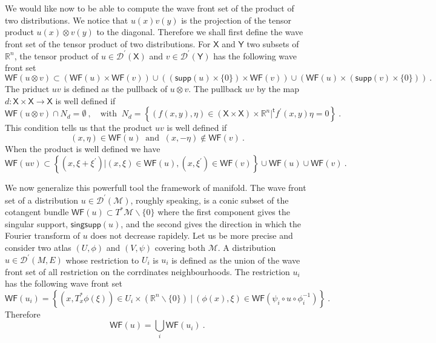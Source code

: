 \documentclass[10pt]{book}
\newcommand{\supp}{\mathsf{supp}}
\newcommand{\singsupp}{\mathsf{singsupp}}
\newcommand{\WF}{\mathsf{WF}}
\newcommand{\Dcal}{\mathcal{D}}
\newcommand{\Mcal}{\mathcal{M}}
\newcommand{\Rbb}{\mathbb{R}}
\newcommand{\Xsf}{\mathsf{X}}
\newcommand{\Ysf}{\mathsf{Y}}
\newcommand{\tsf}{\mathsf{t}}
\theoremstyle{break}
\begin{document}
We would like now to be able to compute the wave front set of the product of two distributions. We notice that $u(x)v(y)$ is the projection of the tensor product $u(x) \otimes v(y)$ to the diagonal. Therefore we shall first define the wave front set of the tensor product of two distributions. For $\Xsf$ and $\Ysf$ two subsets of $\Rbb^n$, the tensor product of $u\in\Dcal^\prime(\Xsf)$ and $v\in\Dcal^\prime(\Ysf)$ has the following wave front set
%
\begin{equation*}
\WF(u \otimes v) \subset \left( \WF(u) \times \WF(v) \right) \cup \left( \left( \supp(u) \times \{0\} \right) \times \WF(v) \right) \cup \left( \WF(u) \times \left( \supp(v) \times \{0\} \right) \right) \ . 
\end{equation*}
%
The priduct $uv$ is defined as the pullback of $u \otimes v$. The pullback $u v$ by the map $d : \Xsf \times \Xsf \to \Xsf$ is well defined if 
%
\begin{equation*}
\WF(u \otimes v) \cap N_d = \emptyset \ , \quad \mbox{with } \ N_d = \left\{ (f(x,y) , \eta) \in ( \Xsf \times \Xsf )\times \Rbb^n | ^{\tsf}f^\prime(x,y) \eta = 0 \right\} \ .
\end{equation*}
%
This condition tells us that the product $uv$ is well defined if 
%
\begin{equation*}
(x,\eta) \in \WF(u) \ \mbox{ and } \ (x,-\eta) \notin \WF(v) \ . 
\end{equation*}
%
When the product is well defined we have 
%
\begin{equation*}
\WF(u v) \subset \left\{ (x,\xi+\xi^\prime) | (x,\xi) \in \WF(u) , (x,\xi^\prime) \in \WF(v) \right\} \cup \WF(u) \cup \WF(v) \ . 
\end{equation*}


\bigskip


We now generalize this powerfull tool the framework of manifold. The wave front set of a distribution $u \in \Dcal^\prime(\Mcal)$, roughly speaking, is a conic subset of the cotangent bundle $\WF(u) \subset T^\ast\Mcal\backslash\{0\}$ where the first component gives the singular support, $\singsupp(u)$, and the second gives the direction in which the Fourier transform of $u$ does not decrease rapidely. Let us be more precise and consider two atlas ${(U,\phi)}$ and ${(V,\psi)}$ covering both $\Mcal$. A distribution $u\in\Dcal^\prime(M,E)$ whose restriction to $U_i$ is $u_i$ is defined as the union of the wave front set of all restriction on the corrdinates neighbourhoods. The restriction $u_i$ has the following wave front set
%
\begin{equation*}
\WF(u_i) = \left\{ \left( x,T_x^\ast\phi(\xi) \right) \in U_i \times \left( \Rbb^n \backslash \{0\} \right) \ | \ \left( \phi(x) , \xi \right) \in \WF\left( \psi_i \circ u \circ \phi_i^{-1} \right) \right\} \ . 
\end{equation*}
%
Therefore
%
\begin{equation*}
\WF(u) = \bigcup_i \WF(u_i) \ . 
\end{equation*}
\end{document}
